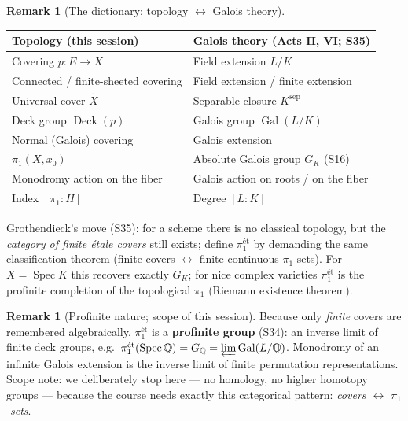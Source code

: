 \documentclass[11pt,a4paper]{article}
\theoremstyle{definition}
\newtheorem{remark}[theorem]{Remark}
\newcommand{\Q}{\mathbb{Q}}
\newcommand{\Deck}{\operatorname{Deck}}
\newcommand{\Gal}{\operatorname{Gal}}
\newcommand{\Spec}{\operatorname{Spec}}
\begin{document}
	\begin{remark}[The dictionary: topology $\leftrightarrow$ Galois theory]\label{rem:dictionary}
		\begin{center}\small
			\begin{tabular}{|l|l|}
				\hline
				\textbf{Topology (this session)} & \textbf{Galois theory (Acts II, VI; S35)} \\
				\hline
				Covering $p:E\to X$ & Field extension $L/K$ \\
				Connected / finite-sheeted covering & Field extension / finite extension \\
				Universal cover $\tilde X$ & Separable closure $K^{\mathrm{sep}}$ \\
				Deck group $\Deck(p)$ & Galois group $\Gal(L/K)$ \\
				Normal (Galois) covering & Galois extension \\
				$\pi_1(X,x_0)$ & Absolute Galois group $G_K$ (S16) \\
				Monodromy action on the fiber & Galois action on roots / on the fiber \\
				Index $[\pi_1:H]$ & Degree $[L:K]$ \\
				\hline
			\end{tabular}
		\end{center}
		Grothendieck's move (S35): for a scheme there is no classical topology, but the \emph{category of
			finite \'etale covers} still exists; define $\pi_1^{\text{\'et}}$ by demanding the same
		classification theorem (finite covers $\leftrightarrow$ finite continuous $\pi_1$-sets). For
		$X=\Spec K$ this recovers exactly $G_K$; for nice complex varieties $\pi_1^{\text{\'et}}$ is the
		profinite completion of the topological $\pi_1$ (Riemann existence theorem).
	\end{remark}
	
	\begin{remark}[Profinite nature; scope of this session]\label{rem:profinite-scope}
		Because only \emph{finite} covers are remembered algebraically, $\pi_1^{\text{\'et}}$ is a
		\textbf{profinite group} (S34): an inverse limit of finite deck groups, e.g.\
		$\pi_1^{\text{\'et}}(\Spec\Q)=G_\Q=\varprojlim \Gal(L/\Q)$. Monodromy of an infinite Galois extension
		is the inverse limit of finite permutation representations. Scope note: we deliberately stop here ---
		no homology, no higher homotopy groups --- because the course needs exactly this categorical
		pattern: \emph{covers $\leftrightarrow$ $\pi_1$-sets}.
	\end{remark}
	
\end{document}
